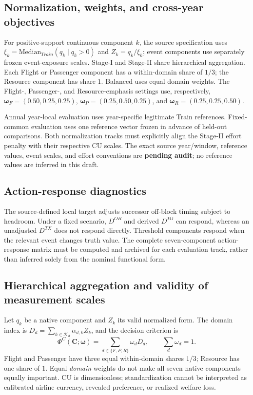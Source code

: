 \documentclass[10pt,a4paper]{article}
\numberwithin{equation}{section}
\begin{document}
\subsection{Normalization, weights, and cross-year objectives}
For positive-support continuous component $k$, the source specification uses $\xi_k=\mathrm{Median}_{Train}(q_k\mid q_k>0)$ and $Z_k=q_k/\xi_k$; event components use separately frozen event-exposure scales. Stage-I and Stage-II share hierarchical aggregation. Each Flight or Passenger component has a within-domain share of $1/3$; the Resource component has share $1$. Balanced uses equal domain weights. The Flight-, Passenger-, and Resource-emphasis settings use, respectively, $\boldsymbol\omega_F=(0.50,0.25,0.25)$, $\boldsymbol\omega_P=(0.25,0.50,0.25)$, and $\boldsymbol\omega_R=(0.25,0.25,0.50)$.

Annual year-local evaluation uses year-specific legitimate Train references. Fixed-common evaluation uses one reference vector frozen in advance of held-out comparisons. Both normalization tracks must explicitly align the Stage-II effort penalty with their respective CU scales. The exact source year/window, reference values, event scales, and effort conventions are \textbf{pending audit}; no reference values are inferred in this draft.

\subsection{Action-response diagnostics}
The source-defined local target adjusts successor off-block timing subject to headroom. Under a fixed scenario, $D^{OB}$ and derived $D^{TO}$ can respond, whereas an unadjusted $D^{TX}$ does not respond directly. Threshold components respond when the relevant event changes truth value. The complete seven-component action-response matrix must be computed and archived for each evaluation track, rather than inferred solely from the nominal functional form.

\subsection{Hierarchical aggregation and validity of measurement scales}
Let $q_k$ be a native component and $Z_k$ its valid normalized form. The domain index is $D_d=\sum_{k\in\mathcal K_d} \alpha_{d,k}Z_k$, and the decision criterion is
\begin{equation}
\Phi^C(\mathbf C;\boldsymbol\omega)
=\sum_{d\in\{F,P,R\}}\omega_dD_d,
\qquad\sum_d\omega_d=1.
\label{eq:sup_domain_criterion}
\end{equation}
Flight and Passenger have three equal within-domain shares $1/3$; Resource has one share of $1$. Equal \emph{domain} weights do not make all seven native components equally important. CU is dimensionless; standardization cannot be interpreted as calibrated airline currency, revealed preference, or realized welfare loss.
\end{document}
